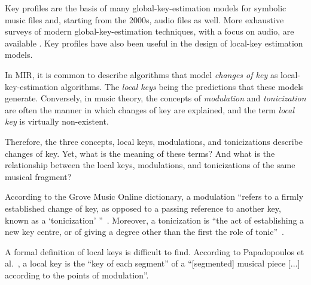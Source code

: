 
Key profiles are the basis of many global-key-estimation
models for symbolic music files and, starting from the
2000s, audio files as well. More exhaustive surveys of
modern global-key-estimation techniques, with a focus on
audio, are available \parencite{korzeniowski2018harmonic,
campbell2010automatic}. Key profiles have also been useful
in the design of local-key estimation models.

\label{ssec:terminology}

In MIR, it is common to describe algorithms that model
\emph{changes of key} as local-key-estimation algorithms.
The \emph{local keys} being the predictions that these
models generate. Conversely, in music theory, the concepts
of \emph{modulation} and \emph{tonicization} are often the
manner in which changes of key are explained, and the term
\emph{local key} is virtually non-existent.

Therefore, the three concepts, local keys, modulations, and
tonicizations describe changes of key. Yet, what is the
meaning of these terms? And what is the relationship between
the local keys, modulations, and tonicizations of the same
musical fragment?

According to the Grove Music Online dictionary, a modulation
``refers to a firmly established change of key, as opposed
to a passing reference to another key, known as a
`tonicization' ''~\parencite{saslawgrovemodulation}.
Moreover, a tonicization is ``the act of establishing a new
key centre, or of giving a degree other than the first the
role of tonic''~\parencite{drabkintonicization}.

A formal definition of local keys is difficult to find.
According to Papadopoulos et
al.~\parencite{papadopoulos2009local}, a local key is the
``key of each segment'' of a ``[segmented] musical piece
[...] according to the points of modulation''.

